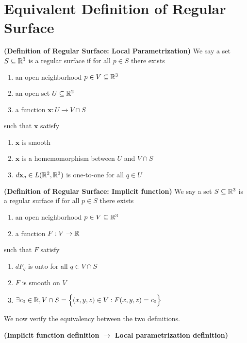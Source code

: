 \documentclass{report}
\begin{document}
\section{Equivalent Definition of Regular Surface}
\begin{definition}
\textbf{(Definition of Regular Surface: Local Parametrization)} We say a set $S\subseteq \mathbb{R}^3$ is a regular surface if for all $p \in S$ there exists 
\begin{enumerate}[label=(\alph*)]
  \item an open neighborhood $p \in V\subseteq \mathbb{R}^3$
  \item an open set $U\subseteq \mathbb{R}^2$
  \item a function $\textbf{x}:U\rightarrow V\cap S$
\end{enumerate}
such that $\textbf{x}$ satisfy
\begin{enumerate}[label=(\alph*)]
  \item $\textbf{x}$ is smooth 
  \item $\textbf{x}$ is a homemomorphism between $U$ and  $V\cap S$
  \item $d\textbf{x}_q \in L(\mathbb{R}^2,\mathbb{R}^3)$ is one-to-one for all $q\in U$ 
\end{enumerate}
\end{definition}
\begin{definition}
\textbf{(Definition of Regular Surface: Implicit function)} We say a set $S\subseteq \mathbb{R}^3$ is a regular surface if for all $p \in S$ there exists 
\begin{enumerate}[label=(\alph*)]
  \item an open neighborhood $p \in V\subseteq \mathbb{R}^3$ 
  \item a function $F:V\rightarrow \mathbb{R}$ 
\end{enumerate}
such that $F$ satisfy
\begin{enumerate}[label=(\alph*)]
  \item $dF_q$ is onto for all $q\in V\cap S$
  \item $F$ is smooth on  $V$
  \item $\exists c_0\in\mathbb{R}, V\cap S=\Big\{ (x,y,z)\in V:F(x,y,z)=c_0 \Big\}$
\end{enumerate}
\end{definition}
\begin{mdframed}
We now verify the equivalency between the two definitions. 
\end{mdframed}
\begin{theorem}
\textbf{(Implicit function definition $\longrightarrow$ Local parametrization definition)} 
\end{theorem}
\end{document}

